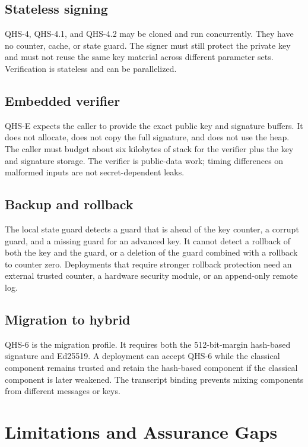 \documentclass[11pt,a4paper]{article}
\begin{document}
\subsection{Stateless signing}

QHS-4, QHS-4.1, and QHS-4.2 may be cloned and run concurrently. They have no
counter, cache, or state guard. The signer must still protect the private key
and must not reuse the same key material across different parameter sets.
Verification is stateless and can be parallelized.

\subsection{Embedded verifier}

QHS-E expects the caller to provide the exact public key and signature
buffers. It does not allocate, does not copy the full signature, and does not
use the heap. The caller must budget about six kilobytes of stack for the
verifier plus the key and signature storage. The verifier is public-data work;
timing differences on malformed inputs are not secret-dependent leaks.

\subsection{Backup and rollback}

The local state guard detects a guard that is ahead of the key counter, a
corrupt guard, and a missing guard for an advanced key. It cannot detect a
rollback of both the key and the guard, or a deletion of the guard combined
with a rollback to counter zero. Deployments that require stronger rollback
protection need an external trusted counter, a hardware security module, or an
append-only remote log.

\subsection{Migration to hybrid}

QHS-6 is the migration profile. It requires both the 512-bit-margin hash-based
signature and Ed25519. A deployment can accept QHS-6 while the classical
component remains trusted and retain the hash-based component if the classical
component is later weakened. The transcript binding prevents mixing components
from different messages or keys.

\section{Limitations and Assurance Gaps}
\end{document}
